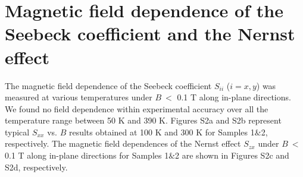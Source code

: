 \documentclass[amsmath,amssymb]{nature}
\begin{document}
	
	\section{Magnetic field dependence of the Seebeck coefficient and the Nernst effect}
	The magnetic field dependence of the Seebeck coefficient $S_{ii}$ ($i= x, y$) was  measured at various temperatures under $B \ <$ 0.1 T along in-plane directions. We found no field dependence within experimental accuracy over all the temperature range between 50 K and 390 K. Figures S2a and S2b represent typical $S_{xx}$ vs. $B$   results obtained at 100 K and 300 K   for Samples 1$\&$2, respectively.
	The magnetic field dependences of the Nernst effect $S_{zx}$  under $B \ <$ 0.1 T along in-plane directions for Samples 1$\&$2 are shown in Figures S2c and S2d, respectively. 
	
\end{document}
